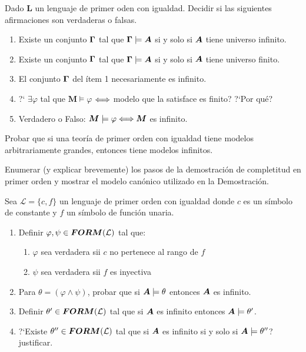 \documentclass[leqno, 12pt, twoside,letterpaper]{book}
\begin{document}
\begin{ej}{4}
    Dado $\bm{L}$ un lenguaje de primer oden con igualdad. Decidir si las
    siguientes afirmaciones son verdaderas o falsas.

    \begin{enumerate}
        \item Existe un conjunto $\bm{\Gamma}$ tal que $\bm{\Gamma} \models \bm{A}$ si  y
            solo si $\bm{A}$ tiene universo infinito.
        \item Existe un conjunto $\bm{\Gamma}$ tal que $\bm{\Gamma} \models \bm{A}$ si y
            solo si $\bm{A}$ tiene universo finito.
        \item El conjunto $\bm{\Gamma}$ del ítem 1 necesariamente es infinito.
    	\item ?` $\exists\varphi$ tal que $\bm{M} \models \varphi$ $\Longleftrightarrow$ modelo que la satisface es finito? ?`Por qué?
    	\item  Verdadero o Falso: $\bm{M} \models \varphi \Longleftrightarrow \bm{M}$ es infinito.
    \end{enumerate}

\end{ej}


\begin{ej}{2}
    Probar que si una teoría de primer orden con igualdad tiene modelos
    arbitrariamente grandes, entonces tiene modelos infinitos.
\end{ej}

\begin{ej}{1}
   Enumerar (y explicar brevemente) los pasos de la demostración de completitud
    en primer orden y mostrar el modelo canónico utilizado en la Demostración.
\end{ej}

\begin{ej}{1}
    Sea $\mathcal{L} = \{c, f\}$ un lenguaje de primer orden con igualdad donde
    $c$ es un símbolo de constante y $f$ un símbolo de función unaria.
    \begin{enumerate}
        \item Definir $\varphi, \psi \in \bm{FORM}(\mathcal{L})$ tal que:
            \begin{enumerate}
                \item $\varphi$ sea verdadera sii $c$ no pertenece al rango de
                    $f$
                \item $\psi$ sea verdadera sii $f$ es inyectiva
            \end{enumerate}
        \item Para $\theta = (\varphi \land \psi)$, probar que si $\bm{A} \models
            \theta$ entonces $\bm{A}$ es infinito.
        \item Definir $\theta' \in \bm{FORM}(\mathcal{L})$ tal que si $\bm{A}$ es
            infinito entonces $\bm{A} \models \theta'$.
        \item ?`Existe $\theta'' \in \bm{FORM}(\mathcal{L})$ tal que si $\bm{A}$ es
            infinito si y solo si $\bm{A} \models \theta''$? justificar.
    \end{enumerate}
\end{ej}
\end{document}
